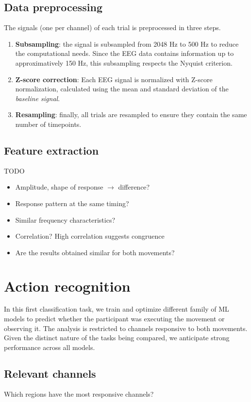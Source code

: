 \documentclass[10pt,conference,compsocconf]{IEEEtran}
\begin{document}
\subsection{Data preprocessing}
The signals (one per channel) of each trial is preprocessed in three steps.
\begin{enumerate}
  \item \textbf{Subsampling}: the signal is subsampled from 2048 Hz to 500 Hz to reduce the computational needs. Since the EEG data contains information up to approximatively 150 Hz, this subsampling respects the Nyquist criterion.
  \item \textbf{Z-score correction}: Each EEG signal is normalized with Z-score normalization, calculated using the mean and standard deviation of the \textit{baseline signal}.
  \item \textbf{Resampling}: finally, all trials are resampled to ensure they contain the same number of timepoints.
\end{enumerate}

\subsection{Feature extraction}
TODO

\begin{itemize}
    \item Amplitude, shape of response \(\to\) difference?
    \item Response pattern at the same timing?
    \item Similar frequency characteristics?
    \item Correlation? High correlation suggests congruence
    \item Are the results obtained similar for both movements?
\end{itemize}

\section{Action recognition}
\label{sec:actionrecognition}
In this first classification task, we train and optimize different family of ML models to predict whether the participant was executing the movement or observing it. The analysis is restricted to channels responsive to both movements. Given the distinct nature of the tasks being compared, we anticipate strong performance across all models.

\subsection{Relevant channels}
Which regions have the most responsive channels?
\end{document}
